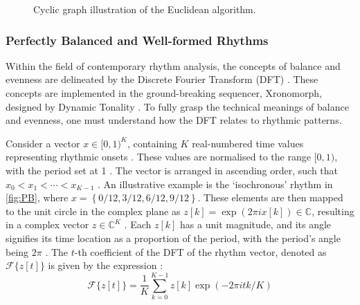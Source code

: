 \documentclass[12pt]{article}
\numberwithin{subsubsubsection}{subsubsection}
\begin{document}
\begin{figure}[H]
    \centering
    \caption{Cyclic graph illustration of the Euclidean algorithm.}
    \label{fig:euclid}
\end{figure}

\subsubsection{Perfectly Balanced and Well-formed Rhythms}

Within the field of contemporary rhythm analysis, the concepts of balance and evenness are delineated by the Discrete Fourier Transform (DFT) \cite{Milne}. These concepts are implemented in the ground-breaking sequencer, Xronomorph, designed by Dynamic Tonality \cite{Milne}. To fully grasp the technical meanings of balance and evenness, one must understand how the DFT relates to rhythmic patterns.

Consider a vector $x \in [0, 1)^K$, containing $K$ real-numbered time values representing rhythmic onsets \cite{Milne}. These values are normalised to the range $[0, 1)$, with the period set at 1 \cite{Milne}. The vector is arranged in ascending order, such that $x_{0} < x_{1} < \cdots < x_{K-1}$ \cite{Milne}. An illustrative example is the ‘isochronous’ rhythm in \autoref{fig:PB}, where $x = \left\{ 0/12, 3/12, 6/12, 9/12\right\}$. These elements are then mapped to the unit circle in the complex plane as $z[k] =  \exp\left(2\pi ix[k]\right) \in \mathbb{C}$, resulting in a complex vector $z \in \mathbb{C}^K$ \cite{Milne}. Each $z[k]$ has a unit magnitude, and its angle signifies its time location as a proportion of the period, with the period's angle being $2\pi$ \cite{Milne}. The $t$-th coefficient of the DFT of the rhythm vector, denoted as $\mathcal{F}\{z[t]\}$ is given by the expression \cite{Milne}: 
\begin{equation}
\mathcal{F}\{z[t]\} = \frac{1}{K} \sum_{k=0}^{K-1}z[k] \exp\left(-2\pi itk/K\right)
\end{equation}
\end{document}
